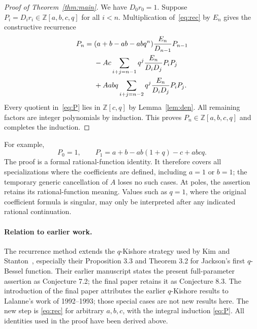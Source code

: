 \documentclass[11pt]{article}
\newcommand{\Z}{\mathbb Z}
\begin{document}
\begin{proof}[Proof of Theorem~\ref{thm:main}]
We have $D_0r_0=1$. Suppose $P_i=D_ir_i\in\Z[a,b,c,q]$ for all $i<n$.
Multiplication of~\eqref{eq:rec} by $E_n$ gives the constructive recurrence
\begin{align}
 P_n={}&(a+b-ab-abq^n)\frac{E_n}{D_{n-1}}P_{n-1}\notag\\
 &-Ac\sum_{i+j=n-1}q^j\frac{E_n}{D_iD_j}P_iP_j\notag\\
 &+Aabq\sum_{i+j=n-2}q^j\frac{E_n}{D_iD_j}P_iP_j.\label{eq:P}
\end{align}
Every quotient in~\eqref{eq:P} lies in $\Z[c,q]$ by
Lemma~\ref{lem:den}. All remaining factors are integer polynomials by
induction. This proves $P_n\in\Z[a,b,c,q]$ and completes the induction.
\end{proof}

For example,
\[
 P_0=1,\qquad P_1=a+b-ab(1+q)-c+abcq.
\]
The proof is a formal rational-function identity. It therefore covers
all specializations where the coefficients are defined, including $a=1$
or $b=1$; the temporary generic cancellation of $A$ loses no such cases.
At poles, the assertion retains its rational-function meaning. Values
such as $q=1$, where the original coefficient formula is singular, may
only be interpreted after any indicated rational continuation.

\paragraph{Relation to earlier work.}
The recurrence method extends the $q$-Kishore strategy used by Kim and
Stanton~\cite{KSB}, especially their Proposition 3.3 and Theorem 3.2 for
Jackson's first $q$-Bessel function. Their earlier manuscript states the
present full-parameter assertion as Conjecture 7.2; the final paper
\cite{KS} retains it as Conjecture 8.3. The introduction of the final
paper attributes the earlier $q$-Kishore results to Lalanne's work of
1992--1993; those special cases are not new results here. The new step is
\eqref{eq:rec} for arbitrary $a,b,c$, with the integral induction
\eqref{eq:P}. All identities used in the proof have been derived above.
\end{document}
